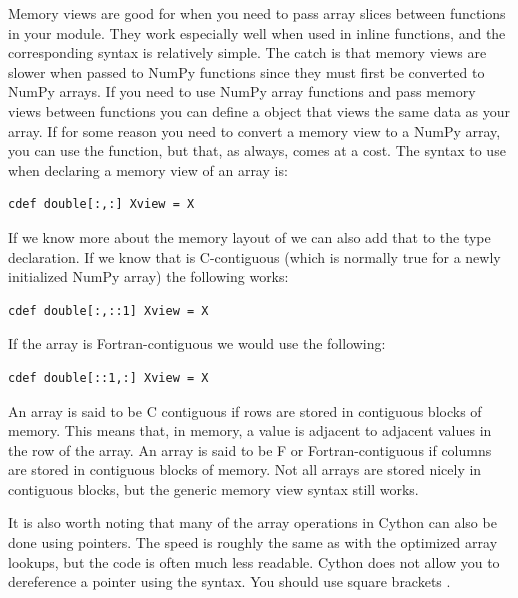 Memory views are good for when you need to pass array slices between functions in your module.
They work especially well when used in inline functions, and the corresponding syntax is relatively simple.
The catch is that memory views are slower when passed to NumPy functions since they must first be converted to NumPy arrays.
If you need to use NumPy array functions and pass memory views between functions you can define a  object that views the same data as your array.
If for some reason you need to convert a memory view to a NumPy array, you can use the  function, but that, as always, comes at a cost.
The syntax to use when declaring a memory view of an array  is:
\begin{lstlisting}
cdef double[:,:] Xview = X
\end{lstlisting}
If we know more about the memory layout of  we can also add that to the type declaration.
If we know that  is C-contiguous (which is normally true for a newly initialized NumPy array) the following works:
\begin{lstlisting}
cdef double[:,::1] Xview = X
\end{lstlisting}
If the array is Fortran-contiguous we would use the following:
\begin{lstlisting}
cdef double[::1,:] Xview = X
\end{lstlisting}
An array is said to be C contiguous if rows are stored in contiguous blocks of memory.
This means that, in memory, a value is adjacent to adjacent values in the row of the array.
An array is said to be F or Fortran-contiguous if columns are stored in contiguous blocks of memory.
Not all arrays are stored nicely in contiguous blocks, but the generic memory view syntax still works.

It is also worth noting that many of the array operations in Cython can also be done using pointers.
The speed is roughly the same as with the optimized array lookups, but the code is often much less readable.
Cython does not allow you to dereference a pointer using the \li{*} syntax.
You should use square brackets \li{[ ]}.

